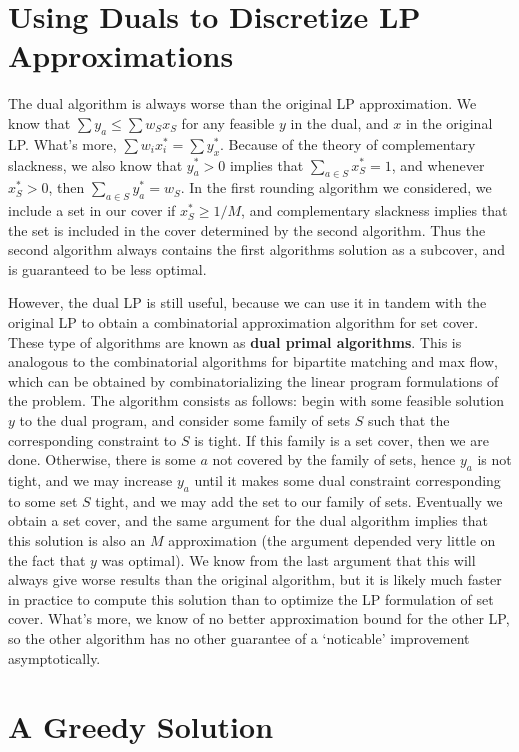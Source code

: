 \section{Using Duals to Discretize LP Approximations}

The dual algorithm is always worse than the original LP approximation. We know that $\sum y_a \leq \sum w_S x_S$ for any feasible $y$ in the dual, and $x$ in the original LP. What's more, $\sum w_i x_i^* = \sum y_x^*$. Because of the theory of complementary slackness, we also know that $y_a^* > 0$ implies that $\sum_{a \in S} x_S^* = 1$, and whenever $x_S^* > 0$, then $\sum_{a \in S} y_a^* = w_S$. In the first rounding algorithm we considered, we include a set in our cover if $x_S^* \geq 1/M$, and complementary slackness implies that the set is included in the cover determined by the second algorithm. Thus the second algorithm always contains the first algorithms solution as a subcover, and is guaranteed to be less optimal.

However, the dual LP is still useful, because we can use it in tandem with the original LP to obtain a combinatorial approximation algorithm for set cover. These type of algorithms are known as {\bf dual primal algorithms}. This is analogous to the combinatorial algorithms for bipartite matching and max flow, which can be obtained by combinatorializing the linear program formulations of the problem. The algorithm consists as follows: begin with some feasible solution $y$ to the dual program, and consider some family of sets $S$ such that the corresponding constraint to $S$ is tight. If this family is a set cover, then we are done. Otherwise, there is some $a$ not covered by the family of sets, hence $y_a$ is not tight, and we may increase $y_a$ until it makes some dual constraint corresponding to some set $S$ tight, and we may add the set to our family of sets. Eventually we obtain a set cover, and the same argument for the dual algorithm implies that this solution is also an $M$ approximation (the argument depended very little on the fact that $y$ was optimal). We know from the last argument that this will always give worse results than the original algorithm, but it is likely much faster in practice to compute this solution than to optimize the LP formulation of set cover. What's more, we know of no better approximation bound for the other LP, so the other algorithm has no other guarantee of a `noticable' improvement asymptotically.

\section{A Greedy Solution}

